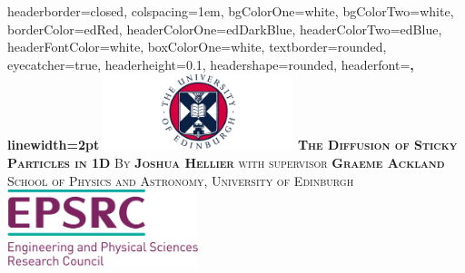 \documentclass[landscape,a0paper,fontscale=0.285]{baposter} %
\begin{document}
\begin{poster}
{
headerborder=closed, %
colspacing=1em, %
bgColorOne=white, %
bgColorTwo=white, %
borderColor=edRed, %
headerColorOne=edDarkBlue, %
headerColorTwo=edBlue, %
headerFontColor=white, %
boxColorOne=white, %
textborder=rounded, %
eyecatcher=true, %
headerheight=0.1\textheight, %
headershape=rounded, %
headerfont=\Large\bf\textsc, %
linewidth=2pt %
}
%
{\includegraphics[height=6em]{longUoELogo}} %
{\bf\textsc{The Diffusion of Sticky Particles in 1D}\vspace{0.5em}} %
{\textsc{By \textbf{Joshua Hellier} with supervisor \textbf{Graeme Ackland} \\ School of Physics and Astronomy, University of Edinburgh}} %
{\includegraphics[height=6em]{sponsorFullResCrop}} %


\end{poster}
\end{document}
